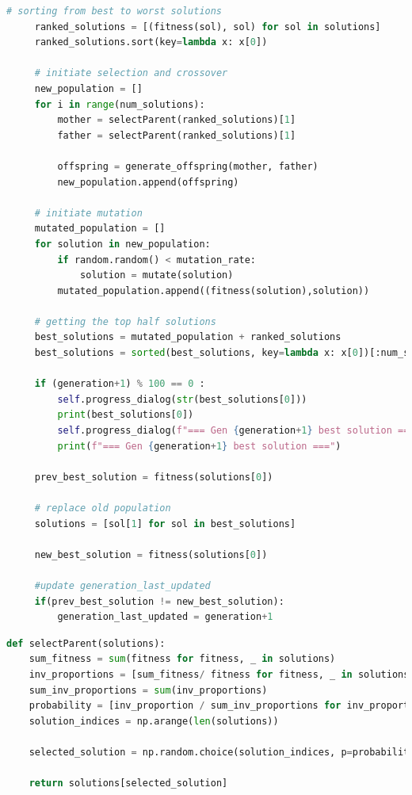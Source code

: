 \begin{appendices}
\begin{centerappendixtitle}
\begin{lstlisting}[language=Python, caption={Genetic Algorithm}, label={genalgoCode}, breaklines=true]
     # sorting from best to worst solutions
     ranked_solutions = [(fitness(sol), sol) for sol in solutions]
     ranked_solutions.sort(key=lambda x: x[0])

     # initiate selection and crossover
     new_population = []
     for i in range(num_solutions):
         mother = selectParent(ranked_solutions)[1]
         father = selectParent(ranked_solutions)[1]

         offspring = generate_offspring(mother, father)
         new_population.append(offspring)

     # initiate mutation
     mutated_population = []
     for solution in new_population:
         if random.random() < mutation_rate:
             solution = mutate(solution)
         mutated_population.append((fitness(solution),solution))

     # getting the top half solutions
     best_solutions = mutated_population + ranked_solutions
     best_solutions = sorted(best_solutions, key=lambda x: x[0])[:num_solutions] 

     if (generation+1) % 100 == 0 :
         self.progress_dialog(str(best_solutions[0]))
         print(best_solutions[0])
         self.progress_dialog(f"=== Gen {generation+1} best solution ===")
         print(f"=== Gen {generation+1} best solution ===")

     prev_best_solution = fitness(solutions[0])

     # replace old population
     solutions = [sol[1] for sol in best_solutions]

     new_best_solution = fitness(solutions[0])

     #update generation_last_updated
     if(prev_best_solution != new_best_solution):
         generation_last_updated = generation+1
\end{lstlisting}
		
\begin{lstlisting}[language=Python,caption={Genetic Algorithm - Selection}, label={selectionCode}]
def selectParent(solutions):
	sum_fitness = sum(fitness for fitness, _ in solutions)
	inv_proportions = [sum_fitness/ fitness for fitness, _ in solutions]
	sum_inv_proportions = sum(inv_proportions)
	probability = [inv_proportion / sum_inv_proportions for inv_proportion in inv_proportions]
	solution_indices = np.arange(len(solutions))
	
	selected_solution = np.random.choice(solution_indices, p=probability)
	
	return solutions[selected_solution]
\end{lstlisting}


\end{centerappendixtitle}
\end{appendices}
